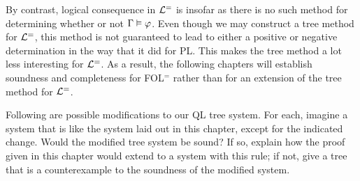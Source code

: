 By contrast, logical consequence in $\mathcal{L}^{=}$ is  insofar as there is no such method for determining whether or not $\Gamma \vDash \varphi$.
Even though we may construct a tree method for $\mathcal{L}^{=}$, this method is not guaranteed to lead to either a positive or negative determination in the way that it did for PL.
This makes the tree method a lot less interesting for $\mathcal{L}^{=}$.
As a result, the following chapters will establish soundness and completeness for FOL$^=$ rather than for an extension of the tree method for $\mathcal{L}^{=}$.


\iffalse

\practiceproblems

\solutions
\problempart
\label{pr.QLalttrees-sound}
Following are possible modifications to our QL tree system. For each, imagine a system that is like the system laid out in this chapter, except for the indicated change. Would the modified tree system be sound? If so, explain how the proof given in this chapter would extend to a system with this rule; if not, give a tree that is a counterexample to the soundness of the modified system.
